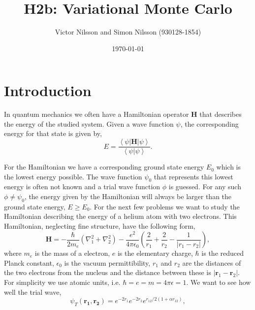 



\title{H2b: Variational Monte Carlo}
\author{Victor Nilsson and Simon Nilsson (930128-1854)}
\date{\today}





\section*{Introduction}

In quantum mechanics we often have a Hamiltonian operator $\mathbf{H}$ that describes the energy of the studied system. Given a wave function $\psi$, the corresponding energy for that state is given by,
\begin{equation}
E=\frac{\left<\psi|\mathbf{H}|\psi\right>}{\left<\psi|\psi\right>}.
\end{equation}

For the Hamiltonian we have a corresponding ground state energy $E_0$ which is the lowest energy possible. The wave function $\psi_0$ that represents this lowest energy is often not known and a trial wave function $\phi$ is guessed. For any such $\phi \neq \psi_0$, the energy given by the Hamiltonian will always be larger than the ground state energy, $E \geq E_0$. For the next few problems we want to study the Hamiltonian describing the energy of a helium atom with two electrons. This Hamiltonian, neglecting fine structure, have the following form,
\begin{equation}
\mathbf{H}=-\frac{\hbar}{2m_e}\left(\nabla_1^2+\nabla_2^2\right)-\frac{e^2}{4\pi \epsilon_0}\left(\frac{2}{r_1}+\frac{2}{r_2}-\frac{1}{|r_1-r_2|}\right),
\end{equation} 
where $m_e$ is the mass of a electron, $e$ is the elementary charge, $\hbar$ is the reduced Planck constant, $\epsilon_0$ is the vacuum permittibility, $r_1$ and $r_2$ are the distances of the two electrons from the nucleus and the distance between these is $|\mathbf{r}_1-\mathbf{r}_2|$. For simplicity we use atomic units, i.e. $\hbar=e=m=4\pi\epsilon=1$. We want to see how well the trial wave,
\begin{equation}
\psi_T(\mathbf{r_1},\mathbf{r_2})=e^{-2r_1}e^{-2r_2}e^{r_{12}/2(1+\alpha r_{12})},
\end{equation}

